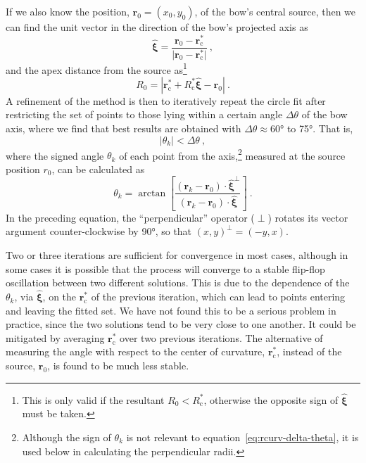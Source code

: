 \documentclass[useAMS, usenatbib, a4paper]{mnras}
\newcommand\C{\ensuremath{\mathrm{c}}}
\providecommand{\abs}[1]{\lvert#1\rvert}
\providecommand{\Abs}[1]{\left\lvert#1\right\rvert}
\newcommand\uvec[1]{\bm{\hat{#1}}}
\begin{document}
If we also know the position, \(\bm{r}_0 = (x_0, y_0)\), of the bow's
central source, then we can find the unit vector in the direction of
the bow's projected axis as
\begin{equation}
  \label{eq:rcurv-axis-vector}
  \uvec{\xi} = \frac {\bm{r}_0 - \bm{r}_{\C}^*} { \abs{\bm{r}_0 - \bm{r}_{\C}^*}} \ , 
\end{equation}
and the apex distance from the source as\footnote{%
  This is only valid if the resultant \(R_0 < R_{\C}^*\), otherwise
  the opposite sign of \(\uvec{\xi}\) must be taken.}
\begin{equation}
  \label{eq:rcurv-apex-distance}
  R_0 = \Abs{\bm{r}_{\C}^* + R_{\C}^* \uvec{\xi} - \bm{r}_0} \ .
\end{equation}
A refinement of the method is then to iteratively repeat the circle
fit after restricting the set of points to those lying within a
certain angle \(\Delta\theta\) of the bow axis, where we find that best results
are obtained with \(\Delta\theta \approx \ang{60}\) to \ang{75}.  That is, 
\begin{equation}
  \label{eq:rcurv-delta-theta}
  \Abs{\theta_k} < \Delta\theta \ , 
\end{equation}
where the signed angle \(\theta_k\) of each point from the
axis,\footnote{%
  Although the sign of \(\theta_k\) is not relevant to
  equation~\eqref{eq:rcurv-delta-theta}, it is used below in
  calculating the perpendicular radii.  } %
measured at the source position \(r_0\), can be calculated as
\begin{equation}
  \label{eq:rcurv-theta-k}
  \theta_k = \arctan \left[  
    \frac{\left( \bm{r}_k - \bm{r}_0 \right) \cdot \uvec{\xi}^\perp}
    {\left( \bm{r}_k - \bm{r}_0 \right) \cdot \uvec{\xi}}
  \right] \ .
\end{equation}
In the preceding equation, the ``perpendicular'' operator (\(\perp\))
rotates its vector argument counter-clockwise by \ang{90}, so that
\((x, y)^\perp = (-y, x)\).
  
Two or three iterations are sufficient for convergence in most cases,
although in some cases it is possible that the process will converge
to a stable flip-flop oscillation between two different solutions.
This is due to the dependence of the \(\theta_k\), via \(\uvec{\xi}\), on
the \(\bm{r}_{\C}^*\) of the previous iteration, which can lead to
points entering and leaving the fitted set.  We have not found this to
be a serious problem in practice, since the two solutions tend to be
very close to one another.  It could be mitigated by averaging
\(\bm{r}_{\C}^*\) over two previous iterations.  The alternative of
measuring the angle with respect to the center of curvature,
\(\bm{r}_{\C}^*\), instead of the source, \(\bm{r}_0\), is found to be
much less stable.
\end{document}
